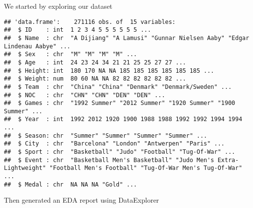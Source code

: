 \documentclass[
  ignorenonframetext,
]{beamer}
\begin{document}
\begin{frame}[fragile]{We started by exploring our dataset}
\begin{verbatim}
## 'data.frame':    271116 obs. of  15 variables:
##  $ ID    : int  1 2 3 4 5 5 5 5 5 5 ...
##  $ Name  : chr  "A Dijiang" "A Lamusi" "Gunnar Nielsen Aaby" "Edgar Lindenau Aabye" ...
##  $ Sex   : chr  "M" "M" "M" "M" ...
##  $ Age   : int  24 23 24 34 21 21 25 25 27 27 ...
##  $ Height: int  180 170 NA NA 185 185 185 185 185 185 ...
##  $ Weight: num  80 60 NA NA 82 82 82 82 82 82 ...
##  $ Team  : chr  "China" "China" "Denmark" "Denmark/Sweden" ...
##  $ NOC   : chr  "CHN" "CHN" "DEN" "DEN" ...
##  $ Games : chr  "1992 Summer" "2012 Summer" "1920 Summer" "1900 Summer" ...
##  $ Year  : int  1992 2012 1920 1900 1988 1988 1992 1992 1994 1994 ...
##  $ Season: chr  "Summer" "Summer" "Summer" "Summer" ...
##  $ City  : chr  "Barcelona" "London" "Antwerpen" "Paris" ...
##  $ Sport : chr  "Basketball" "Judo" "Football" "Tug-Of-War" ...
##  $ Event : chr  "Basketball Men's Basketball" "Judo Men's Extra-Lightweight" "Football Men's Football" "Tug-Of-War Men's Tug-Of-War" ...
##  $ Medal : chr  NA NA NA "Gold" ...
\end{verbatim}
\end{frame}

\begin{frame}{Then generated an EDA report using DataExplorer}
\protect\hypertarget{then-generated-an-eda-report-using-dataexplorer}{}
\end{frame}
\end{document}
